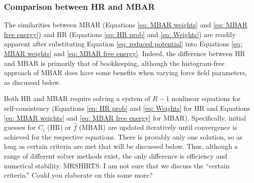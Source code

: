 \documentclass[journal=jced,manuscript=article]{achemso}
\newcommand{\bfv}[1]{{\mbox{\boldmath{$#1$}}}}
\newcommand{\x}{\bfv{x}}
\begin{document}
\subsubsection{Comparison between HR and MBAR} \label{sec: HR and MBAR}

The similarities between MBAR (Equations \ref{eq: MBAR weights} and \ref{eq: MBAR free energy}) and HR (Equations \ref{eq: HR prob} and \ref{eq: Weights}) are readily apparent after substituting Equation \ref{eq: reduced potential} into Equations \ref{eq: MBAR weights} and \ref{eq: MBAR free energy}. Indeed, the difference between HR and MBAR is primarily that of bookkeeping, although the histogram-free approach of MBAR does have some benefits when varying force field parameters, as discussed below. 



Both HR and MBAR require solving a system of $R-1$ nonlinear equations for self-consistency (Equations \ref{eq: HR prob} and \ref{eq: Weights} for HR and Equations \ref{eq: MBAR weights} and \ref{eq: MBAR free energy} for MBAR). Specifically, initial guesses for $C_i$ (HR) or $\hat f$ (MBAR) are updated iteratively until convergence is achieved for the respective equations. There is provably only one solution, so as long as certain criteria are met that will be discussed below. Thus, although a range of different solver methods exist, the only difference is efficiency and numerical stability.
MRSHIRTS: I am not sure that we discuss the ``certain criteria.'' Could you elaborate on this some more?
\end{document}
